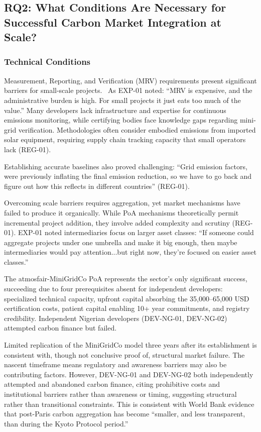 \subsection{RQ2: What Conditions Are Necessary for Successful Carbon Market Integration at Scale?}
\label{subsec:rq2}

\subsubsection{Technical Conditions}
Measurement, Reporting, and Verification (MRV) requirements present significant barriers for small-scale projects.~\cite{michaelowa2005} As EXP-01 noted: ``MRV is expensive, and the administrative burden is high. For small projects it just eats too much of the value.'' Many developers lack infrastructure and expertise for continuous emissions monitoring, while certifying bodies face knowledge gaps regarding mini-grid verification. Methodologies often consider embodied emissions from imported solar equipment, requiring supply chain tracking capacity that small operators lack (REG-01).

Establishing accurate baselines also proved challenging: ``Grid emission factors, were previously inflating the final emission reduction, so we have to go back and figure out how this reflects in different countries'' (REG-01).

Overcoming scale barriers requires aggregation, yet market mechanisms have failed to produce it organically. While PoA mechanisms theoretically permit incremental project addition, they involve added complexity and scrutiny (REG-01). EXP-01 noted intermediaries focus on larger asset classes: ``If someone could aggregate projects under one umbrella and make it big enough, then maybe intermediaries would pay attention...but right now, they're focused on easier asset classes.''

The atmosfair-MiniGridCo PoA represents the sector's only significant success, succeeding due to four prerequisites absent for independent developers: specialized technical capacity, upfront capital absorbing the 35,000--65,000 USD certification costs, patient capital enabling 10+ year commitments, and registry credibility. Independent Nigerian developers (DEV-NG-01, DEV-NG-02) attempted carbon finance but failed.

Limited replication of the MiniGridCo model three years after its establishment is consistent with, though not conclusive proof of, structural market failure. The nascent timeframe means regulatory and awareness barriers may also be contributing factors. However, DEV-NG-01 and DEV-NG-02 both independently attempted and abandoned carbon finance, citing prohibitive costs and institutional barriers rather than awareness or timing, suggesting structural rather than transitional constraints. This is consistent with World Bank evidence that post-Paris carbon aggregation has become ``smaller, and less transparent, than during the Kyoto Protocol period.''~\cite{michaelowa-catalysing}

